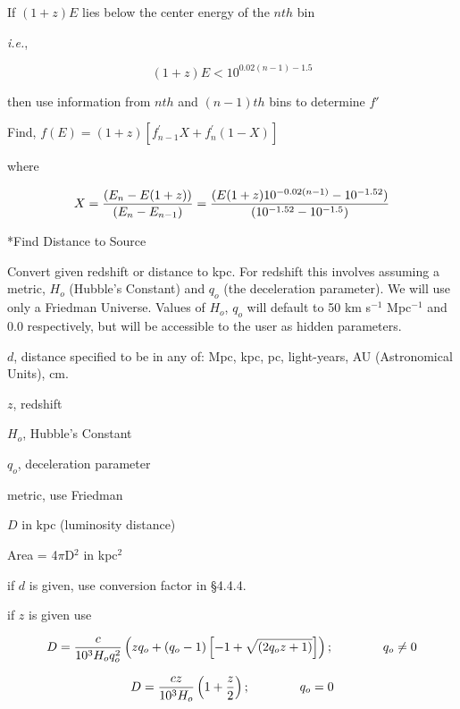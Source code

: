 {\list
 
If $(1+z)E$ lies below the center energy of the $nth$ bin
 
{\it i.e.},

}

$$(1+z)E <10^{0.02(n-1)-1.5}$$

{\list

then use information from $nth$ and $(n-1)th$ bins to determine $f'$
 
Find, $f(E) = (1 + z) \left[ f^{\prime}_{n-1} X + f^{\prime}_{n}(1-X) \right]$

where

}

$$X = {(E_{n}-E(1+z))\over (E_{n}-E_{n-1})} = {(E(1+z)10^{-0.02(n-1)}-10^{-1.52})\over (10^{-1.52}-10^{-1.5})}$$

 
\**Find Distance to Source

{\list


Convert given redshift or distance to kpc. For redshift this
involves assuming a metric, $H_o$ (Hubble's Constant) and $q_o$
(the deceleration parameter).  We will use only a Friedman Universe.
Values of $H_o$, $q_o$ will default to 50 km s$^{-1}$ Mpc$^{-1}$ and 0.0
respectively, but will be accessible to the user as hidden parameters.
 

$d$, distance specified to be in any of:  Mpc, kpc, pc, light-years,
AU (Astronomical Units), cm.
 
$z$, redshift
 
$H_o$, Hubble's Constant
 
$q_o$, deceleration parameter
 
metric, use Friedman
 

$D$ in kpc (luminosity distance)
 
Area = 4$\pi$D$^{2}$ in kpc$^{2}$
 

if $d$ is given, use conversion factor in \S4.4.4.

if $z$ is given use 
 
}

$$D = {c\over 10^3 H_o q_o^2} \left( z q_o + (q_o-1) 
\left[-1+\sqrt{(2q_o z+1)} \right] \right);\qquad\qquad q_o \neq 0$$

$$D = {c z \over 10^3 H_o} \left( 1 + { z \over 2} \right); \qquad\qquad
q_o = 0$$

